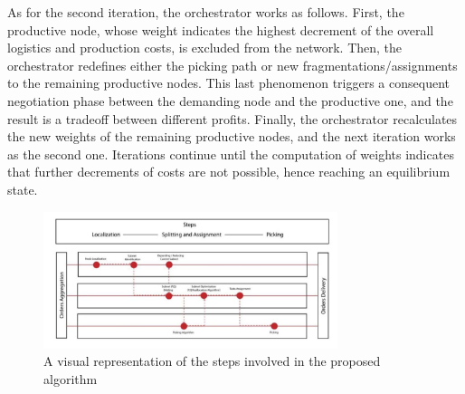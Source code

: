 As for the second iteration, the orchestrator works as follows. First, the productive node, whose weight indicates the highest decrement of the overall logistics and production costs, is excluded from the network. Then, the orchestrator redefines either the picking path or new fragmentations/assignments to the remaining productive nodes. This last phenomenon triggers a consequent negotiation phase between the demanding node and the productive one, and the result is a tradeoff between different profits. Finally, the orchestrator recalculates the new weights of the remaining productive nodes, and the next iteration works as the second one. Iterations continue until the computation of weights indicates that further decrements of costs are not possible, hence reaching an equilibrium state.

\begin{figure}[h]
    \centering
    \includegraphics[height=4cm, keepaspectratio]{images/visual-repr-steps-algorithm}
    \caption{A visual representation of the steps involved in the proposed algorithm}
    \label{fig:visual-repr-steps-algorithm}
\end{figure}

